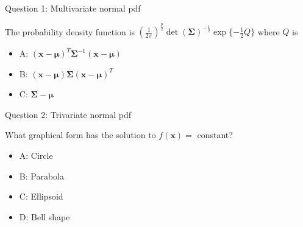 \documentclass[ignorenonframetext,]{beamer}
\providecommand{\tightlist}{%
  \setlength{\itemsep}{0pt}\setlength{\parskip}{0pt}}
\begin{document}
\begin{frame}

\begin{block}{Question 1: Multivariate normal pdf}

\vspace{2mm}

The probability density function is
\((\frac{1}{2\pi})^\frac{p}{2}\det(\boldsymbol\Sigma)^{-\frac{1}{2}}\exp\{-\frac{1}{2}Q\}\)
where \(Q\) is

\vspace{2mm}

\begin{itemize}
\tightlist
\item
  A:
  \((\boldsymbol{x}-\boldsymbol{\mu})^T\boldsymbol\Sigma^{-1}(\boldsymbol{x}-\boldsymbol{\mu})\)
\item
  B:
  \((\boldsymbol{x}-\boldsymbol{\mu})\boldsymbol\Sigma(\boldsymbol{x}-\boldsymbol{\mu})^T\)
\item
  C: \(\boldsymbol\Sigma-\boldsymbol{\mu}\)
\end{itemize}

\end{block}

\end{frame}

\begin{frame}

\begin{block}{Question 2: Trivariate normal pdf}

\vspace{2mm}

What graphical form has the solution to \(f(\boldsymbol{x})=\) constant?

\vspace{2mm}

\begin{itemize}
\tightlist
\item
  A: Circle
\item
  B: Parabola
\item
  C: Ellipsoid
\item
  D: Bell shape
\end{itemize}

\end{block}

\end{frame}
\end{document}
